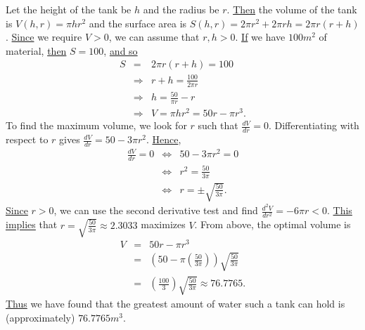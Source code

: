 \begin{goodexample}
Let the height of the tank be $h$ and the radius be $r$.  \underline{Then}
the volume of the tank is $V(h,r) = \pi hr^2$ and the surface area is
$S(h,r) = 2\pi r^2 + 2\pi rh = 2\pi r(r+h)$.  \underline{Since} we require
$V > 0$, we can assume that $r,h > 0$.  \underline{If} we have $100 m^2$
of material, \underline{then} $S = 100$, \underline{and so}
\begin{eqnarray*}
S & = & 2\pi r(r+h) = 100 \\
 & \Rightarrow & r + h = \frac{100}{2\pi r} \\
 & \Rightarrow & h = \frac{50}{\pi r} - r \\
 & \Rightarrow & V = \pi hr^2 = 50r - \pi r^3.
\end{eqnarray*}
To find the maximum volume, we look for $r$ such that $\frac{dV}{dr} = 0$.
Differentiating with respect to $r$ gives $\frac{dV}{dr} = 50 - 3\pi r^2$.
\underline{Hence},
\begin{eqnarray*}
\frac{dV}{dr} = 0 & \Leftrightarrow & 50 - 3\pi r^2 = 0 \\
    & \Leftrightarrow & r^2 = \frac{50}{3\pi} \\
    & \Leftrightarrow & r = \pm \sqrt{\frac{50}{3\pi}}.
\end{eqnarray*}
\underline{Since} $r>0$, we can use the second derivative test and find 
$\frac{d^2V}{dr^2} = -6\pi r <0$. 
\underline{This implies} that  $r = \sqrt{\frac{50}{3\pi}} \approx 2.3033$
maximizes $V$.
From above, the optimal volume is
\begin{eqnarray*}
V & = & 50r - \pi r^3 \\
  & = & \left( 50 - \pi \left( \frac{50}{3\pi} \right) \right) \sqrt{\frac{50}{3\pi}} \\
  & = & \left( \frac{100}{3} \right) \sqrt{\frac{50}{3\pi}} \approx 76.7765.
\end{eqnarray*}
\underline{Thus} we have found that the greatest amount of water such a tank
can hold is (approximately) $76.7765 m^3$.
\end{goodexample}



